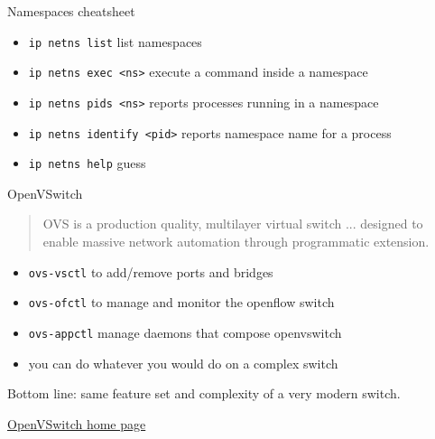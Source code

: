 \documentclass[english,serif,mathserif,xcolor=pdftex,dvipsnames,table]{beamer}
\begin{document}
\begin{frame}
  {Namespaces cheatsheet}

  \begin{itemize}
  \item \texttt{ip netns list} list namespaces
  \+\item \texttt{ip netns exec <ns>} execute a command inside a
    namespace
  \+\item \texttt{ip netns pids <ns>} reports processes running in a
    namespace
  \+\item \texttt{ip netns identify <pid>} reports namespace name for a
    process
  \+\item \texttt{ip netns help} guess
  \end{itemize}
\end{frame}

\begin{frame}
  {OpenVSwitch}

  \begin{quotation}
    OVS is a production quality, multilayer virtual switch
    ... designed to enable massive network automation through
    programmatic extension.
  \end{quotation}

\+

\begin{itemize}
\item \texttt{ovs-vsctl} to add/remove ports and bridges
\item \texttt{ovs-ofctl} to manage and monitor the openflow switch
\item \texttt{ovs-appctl} manage daemons that compose openvswitch
\item you can do whatever you would do on a complex switch
\end{itemize}

Bottom line: same feature set and complexity of a very modern switch.




{\footnotesize\href{http://openvswitch.org/}{OpenVSwitch home page}}
\end{frame}
\end{document}
